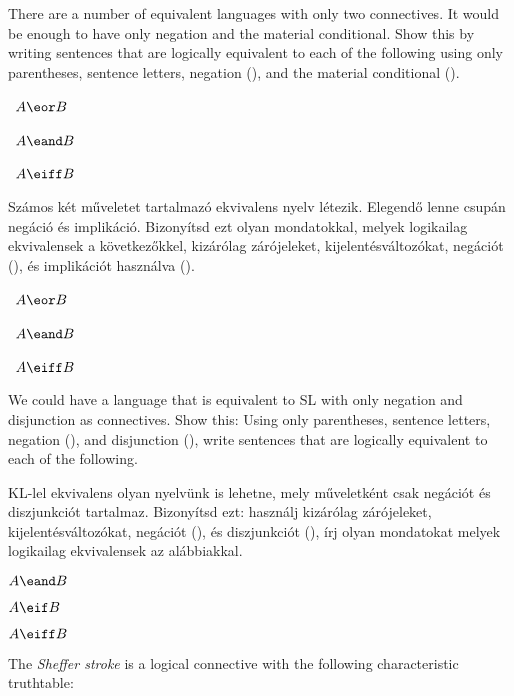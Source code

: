 There are a number of equivalent languages with only two connectives. It would be enough to have only negation and the material conditional. Show this by writing sentences that are logically equivalent to each of the following using only parentheses, sentence letters, negation (\enot), and the material conditional (\eif).
\begin{earg}
\item\leftsolutions\ $A\eor B$
\item\leftsolutions\ $A\eand B$
\item\leftsolutions\ $A\eiff B$
\end{earg}

Számos két műveletet tartalmazó ekvivalens nyelv létezik. Elegendő lenne csupán negáció és implikáció. Bizonyítsd ezt olyan mondatokkal, melyek logikailag ekvivalensek a következőkkel, kizárólag zárójeleket, kijelentésváltozókat, negációt (\enot), és implikációt használva (\eif).
\begin{earg}
\item\leftsolutions\ $A\eor B$
\item\leftsolutions\ $A\eand B$
\item\leftsolutions\ $A\eiff B$
\end{earg}

We could have a language that is equivalent to SL with only negation and disjunction as connectives. Show this: Using only parentheses, sentence letters, negation (\enot), and disjunction (\eor), write sentences that are logically equivalent to each of the following.

KL-lel ekvivalens olyan nyelvünk is lehetne, mely műveletként csak negációt és diszjunkciót tartalmaz. Bizonyítsd ezt: használj kizárólag zárójeleket, kijelentésváltozókat, negációt (\enot), és diszjunkciót (\eor), írj olyan mondatokat melyek logikailag ekvivalensek az alábbiakkal.
\begin{earg}
\item $A \eand B$
\item $A \eif B$
\item $A \eiff B$
\end{earg}
The \emph{Sheffer stroke} is a logical connective with the following characteristic truthtable:

